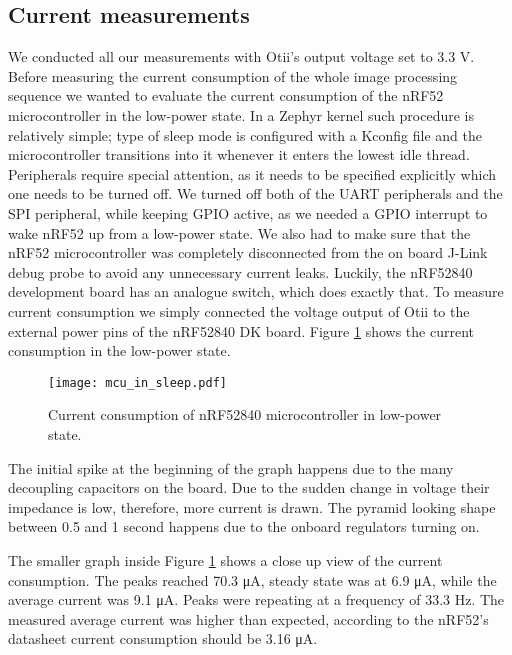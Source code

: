 \subsection{ Current measurements}

We conducted all our measurements with Otii's output voltage set to 3.3 V.
Before measuring the current consumption of the whole image processing sequence we wanted to evaluate the current consumption of the nRF52 microcontroller in the low-power state.
In a Zephyr kernel such procedure is relatively simple; type of sleep mode is configured with a Kconfig file and the microcontroller transitions into it whenever it enters the lowest idle thread.
Peripherals require special attention, as it needs to be specified explicitly which one needs to be turned off.
We turned off both of the UART peripherals and the SPI peripheral, while keeping GPIO active, as we needed a GPIO interrupt to wake nRF52 up from a low-power state.
We also had to make sure that the nRF52 microcontroller was completely disconnected from the on board J-Link debug probe to avoid any unnecessary current leaks.
Luckily, the nRF52840 development board has an analogue switch, which does exactly that.
To measure current consumption we simply connected the voltage output of Otii to the external power pins of the nRF52840 DK board.
Figure \ref{mcu_in_sleep} shows the current consumption in the low-power state.
\newline
\begin{figure}[ht]
    \centering
    \texttt{[image: mcu\_in\_sleep.pdf]}
    \caption{ Current consumption of nRF52840 microcontroller in low-power state.}
    \label{mcu_in_sleep}
\end{figure}

The initial spike at the beginning of the graph happens due to the many decoupling capacitors on the board.
Due to the sudden change in voltage their impedance is low, therefore, more current is drawn.
The pyramid looking shape between 0.5 and 1 second happens due to the onboard regulators turning on.

The smaller graph inside Figure \ref{mcu_in_sleep} shows a close up view of the current consumption.
The peaks reached 70.3 \si{\micro\ampere}, steady state was at 6.9 \si{\micro\ampere}, while the average current was 9.1 \si{\micro\ampere}.
Peaks were repeating at a frequency of 33.3 \si{\hertz}.
\clearpage
The measured average current was higher than expected, according to the nRF52's datasheet\cite{nrf52_datasheet} current consumption should be 3.16 \si{\micro\ampere}.

